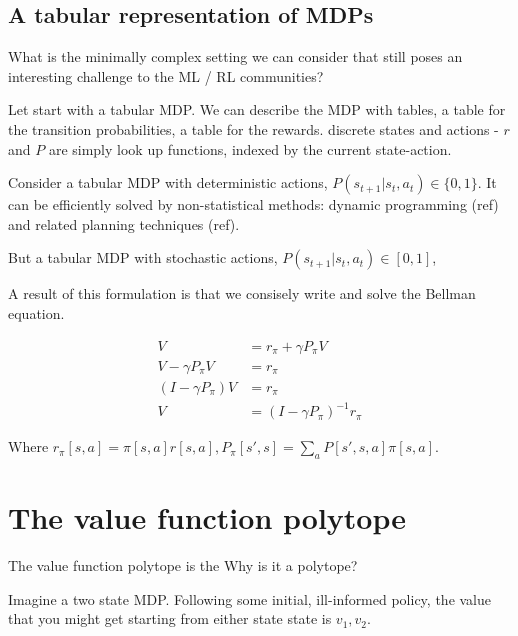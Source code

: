 \hypertarget{a-tabular-representation-of-mdps}{%
\subsection{A tabular representation of MDPs}\label{a-tabular-representation-of-mdps}}

\begin{displayquote}
  What is the minimally complex setting we can consider that still poses an
  interesting challenge to the ML / RL communities?
\end{displayquote}

Let start with a tabular MDP. We can describe the MDP with tables, a table for the transition probabilities,
a table for the rewards. discrete states and
actions - \(r\) and \(P\) are simply look up functions, indexed by the
current state-action.

Consider a tabular MDP with deterministic actions, $P(s_{t+1}|s_t, a_t) \in \{ 0, 1\}$.
It can be efficiently solved by non-statistical
methods: dynamic programming (ref) and related planning techniques (ref).

But a tabular MDP with stochastic actions, $P(s_{t+1}|s_t, a_t) \in [0, 1]$,



A result of this formulation is that we consisely write and solve the Bellman equation.

\begin{align}
V &= r_{\pi} + \gamma P_{\pi} V \tag{the bellman eqn}\\
V - \gamma P_{\pi} V &= r_{\pi}\\
(I-\gamma P_{\pi})V &= r_{\pi}\\
V &= (I-\gamma P_{\pi})^{-1}r_{\pi}
\end{align}

Where $r_{\pi}[s, a] =  \pi[s, a] r[s, a], P_{\pi}[s', s] = \sum_a P[s', s, a]\pi[s, a]$.

\section{The value function polytope}

The value function polytope \cite{Dadashi2018} is the
Why is it a polytope?

Imagine a two state MDP. Following some initial, ill-informed policy,
the value that you might get starting from either state state is $v_1, v_2$.



